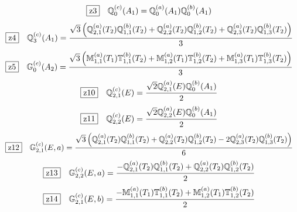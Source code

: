 \documentclass[fleqn,10pt,landscape]{jsarticle}
\begin{document}
\begin{dmath*}
\hspace*{3mm}\fbox{z3}\quad \mathbb{Q}_{0}^{(c)}(A_{1})=\mathbb{Q}_{0}^{(a)}(A_{1}) \mathbb{Q}_{0}^{(b)}(A_{1})
\end{dmath*}
\begin{dmath*}
\hspace*{3mm}\fbox{z4}\quad \mathbb{Q}_{3}^{(c)}(A_{1})=\frac{\sqrt{3} \left(\mathbb{Q}_{2,1}^{(a)}(T_{2}) \mathbb{Q}_{1,1}^{(b)}(T_{2}) + \mathbb{Q}_{2,2}^{(a)}(T_{2}) \mathbb{Q}_{1,2}^{(b)}(T_{2}) + \mathbb{Q}_{2,3}^{(a)}(T_{2}) \mathbb{Q}_{1,3}^{(b)}(T_{2})\right)}{3}
\end{dmath*}
\begin{dmath*}
\hspace*{3mm}\fbox{z5}\quad \mathbb{G}_{0}^{(c)}(A_{2})=\frac{\sqrt{3} \left(\mathbb{M}_{1,1}^{(a)}(T_{1}) \mathbb{T}_{1,1}^{(b)}(T_{2}) + \mathbb{M}_{1,2}^{(a)}(T_{1}) \mathbb{T}_{1,2}^{(b)}(T_{2}) + \mathbb{M}_{1,3}^{(a)}(T_{1}) \mathbb{T}_{1,3}^{(b)}(T_{2})\right)}{3}
\end{dmath*}
\begin{dmath*}
\hspace*{3mm}\fbox{z10}\quad \mathbb{Q}_{2,1}^{(c)}(E)=\frac{\sqrt{2} \mathbb{Q}_{2,1}^{(a)}(E) \mathbb{Q}_{0}^{(b)}(A_{1})}{2}
\end{dmath*}
\begin{dmath*}
\hspace*{3mm}\fbox{z11}\quad \mathbb{Q}_{2,2}^{(c)}(E)=\frac{\sqrt{2} \mathbb{Q}_{2,2}^{(a)}(E) \mathbb{Q}_{0}^{(b)}(A_{1})}{2}
\end{dmath*}
\begin{dmath*}
\hspace*{3mm}\fbox{z12}\quad \mathbb{G}_{2,1}^{(c)}(E,a)=\frac{\sqrt{3} \left(\mathbb{Q}_{2,1}^{(a)}(T_{2}) \mathbb{Q}_{1,1}^{(b)}(T_{2}) + \mathbb{Q}_{2,2}^{(a)}(T_{2}) \mathbb{Q}_{1,2}^{(b)}(T_{2}) - 2 \mathbb{Q}_{2,3}^{(a)}(T_{2}) \mathbb{Q}_{1,3}^{(b)}(T_{2})\right)}{6}
\end{dmath*}
\begin{dmath*}
\hspace*{3mm}\fbox{z13}\quad \mathbb{G}_{2,2}^{(c)}(E,a)=\frac{- \mathbb{Q}_{2,1}^{(a)}(T_{2}) \mathbb{Q}_{1,1}^{(b)}(T_{2}) + \mathbb{Q}_{2,2}^{(a)}(T_{2}) \mathbb{Q}_{1,2}^{(b)}(T_{2})}{2}
\end{dmath*}
\begin{dmath*}
\hspace*{3mm}\fbox{z14}\quad \mathbb{G}_{2,1}^{(c)}(E,b)=\frac{- \mathbb{M}_{1,1}^{(a)}(T_{1}) \mathbb{T}_{1,1}^{(b)}(T_{2}) + \mathbb{M}_{1,2}^{(a)}(T_{1}) \mathbb{T}_{1,2}^{(b)}(T_{2})}{2}
\end{dmath*}
\end{document}
